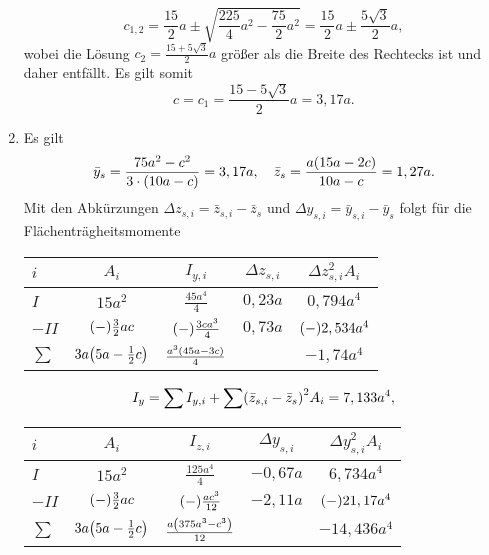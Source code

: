 \documentclass{exercise}
\begin{document}
\begin{enumerate}
        \[
            c_{1, 2} = \frac{15}{2}a \pm \sqrt{\frac{225}{4}a^2 - \frac{75}{2}a^2} = \frac{15}{2}a \pm \frac{5\sqrt{3}}{2}a,
        \]
        wobei die Lösung \(c_2 = \frac{15 + 5\sqrt{3}}{2}a\) größer als die Breite des Rechtecks ist und daher entfällt.
        Es gilt somit
        \[
            c = c_1 = \frac{15 - 5\sqrt{3}}{2}a = 3,17a.
        \]
        \item Es gilt
        \[
            \bar{y}_s = \frac{75a^2 - c^2}{3 \cdot \parentheses*{10a - c}} = 3,17a, \quad \bar{z}_s = \frac{a\parentheses*{15a - 2c}}{10a - c} = 1,27a.
        \]
        Mit den Abkürzungen \(\Delta z_{s, i} = \bar{z}_{s, i} - \bar{z}_s\) und \(\Delta y_{s, i} = \bar{y}_{s, i} - \bar{y}_s\) folgt für die Flächenträgheitsmomente
        \begin{center}
            \begin{tabular}{lcccc}
                \toprule
                \(i\) & \(A_i\) & \(I_{y, i}\) & \(\Delta z_{s, i}\) & \(\Delta z_{s, i}^2 A_i\)\\
                \midrule
                \(I\) & \(15a^2\) & \(\frac{45a^4}{4}\) & \(0,23a\) & \(0,794a^4\)\\
                \(-II\) & \(\parentheses*{-}\frac{3}{2}ac\) & \(\parentheses*{-}\frac{3ca^3}{4}\) & \(0,73a\) & \(\parentheses*{-}2,534a^4\)\\
                \midrule
                \(\sum\) & \(3a\parentheses*{5a - \frac{1}{2}c}\) & \(\frac{a^3\parentheses*{45a - 3c}}{4}\) & & \(-1,74a^4\)\\
                \bottomrule
            \end{tabular}
        \end{center}
        \[
            I_y = \sum I_{y, i} + \sum\parentheses*{\bar{z}_{s, i} - \bar{z}_s}^2 A_i = 7,133a^4,
        \]
        \begin{center}
            \begin{tabular}{lcccc}
                \toprule
                \(i\) & \(A_i\) & \(I_{z, i}\) & \(\Delta y_{s, i}\) & \(\Delta y_{s, i}^2 A_i\)\\
                \midrule
                \(I\) & \(15a^2\) & \(\frac{125a^4}{4}\) & \(-0,67a\) & \(6,734a^4\)\\
                \(-II\) & \(\parentheses*{-}\frac{3}{2}ac\) & \(\parentheses*{-}\frac{ac^3}{12}\) & \(-2,11a\) & \(\parentheses*{-}21,17a^4\)\\
                \midrule
                \(\sum\) & \(3a\parentheses*{5a - \frac{1}{2}c}\) & \(\frac{a\parentheses*{375a^3 - c^3}}{12}\) & & \(-14,436a^4\)\\

\end{tabular}
\end{center}
\end{enumerate}
\end{document}
